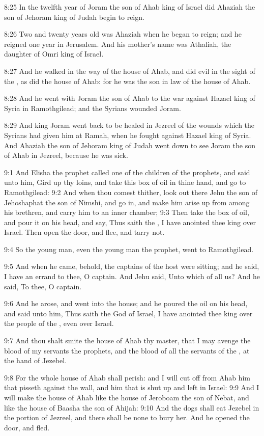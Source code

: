 8:25 In the twelfth year of Joram the son of Ahab king of Israel did Ahaziah the son of Jehoram king of Judah begin to reign.

8:26 Two and twenty years old was Ahaziah when he began to reign; and he reigned one year in Jerusalem. And his mother's name was Athaliah, the daughter of Omri king of Israel.

8:27 And he walked in the way of the house of Ahab, and did evil in the sight of the \LORD, as did the house of Ahab: for he was the son in law of the house of Ahab.

8:28 And he went with Joram the son of Ahab to the war against Hazael king of Syria in Ramothgilead; and the Syrians wounded Joram.

8:29 And king Joram went back to be healed in Jezreel of the wounds which the Syrians had given him at Ramah, when he fought against Hazael king of Syria. And Ahaziah the son of Jehoram king of Judah went down to see Joram the son of Ahab in Jezreel, because he was sick.

9:1 And Elisha the prophet called one of the children of the prophets, and said unto him, Gird up thy loins, and take this box of oil in thine hand, and go to Ramothgilead: 9:2 And when thou comest thither, look out there Jehu the son of Jehoshaphat the son of Nimshi, and go in, and make him arise up from among his brethren, and carry him to an inner chamber; 9:3 Then take the box of oil, and pour it on his head, and say, Thus saith the \LORD, I have anointed thee king over Israel.  Then open the door, and flee, and tarry not.

9:4 So the young man, even the young man the prophet, went to Ramothgilead.

9:5 And when he came, behold, the captains of the host were sitting; and he said, I have an errand to thee, O captain. And Jehu said, Unto which of all us? And he said, To thee, O captain.

9:6 And he arose, and went into the house; and he poured the oil on his head, and said unto him, Thus saith the \LORD God of Israel, I have anointed thee king over the people of the \LORD, even over Israel.

9:7 And thou shalt smite the house of Ahab thy master, that I may avenge the blood of my servants the prophets, and the blood of all the servants of the \LORD, at the hand of Jezebel.

9:8 For the whole house of Ahab shall perish: and I will cut off from Ahab him that pisseth against the wall, and him that is shut up and left in Israel: 9:9 And I will make the house of Ahab like the house of Jeroboam the son of Nebat, and like the house of Baasha the son of Ahijah: 9:10 And the dogs shall eat Jezebel in the portion of Jezreel, and there shall be none to bury her. And he opened the door, and fled.

